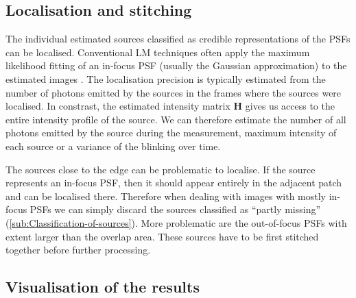 \subsection{Localisation and stitching\label{sub:Localisation-and-stitching}}

The individual estimated sources classified as credible representations of the PSFs can be localised. Conventional LM techniques often apply the maximum likelihood fitting of an in-focus PSF (usually the Gaussian approximation) to the estimated images \cite{Hess2006}. The localisation precision is typically estimated from the number of photons emitted by the sources in the frames where the sources were localised. In constrast, the \inmf{} estimated intensity matrix $\bm{H}$ gives us access to the entire intensity profile of the source. We can therefore estimate the number of all photons emitted by the source during the measurement, maximum intensity of each source or a variance of the blinking over time. 

The sources close to the edge can be problematic to localise. If the source represents an in-focus PSF, then it should appear entirely in the adjacent patch and can be localised there. Therefore when dealing with images with mostly in-focus PSFs we can simply discard the sources classified as ``partly missing'' (\autoref{sub:Classification-of-sources}). More problematic are the out-of-focus PSFs with extent larger than the overlap area. These sources have to be first stitched together before further processing.


\subsection{Visualisation of the results\label{sub:visualisation}}

